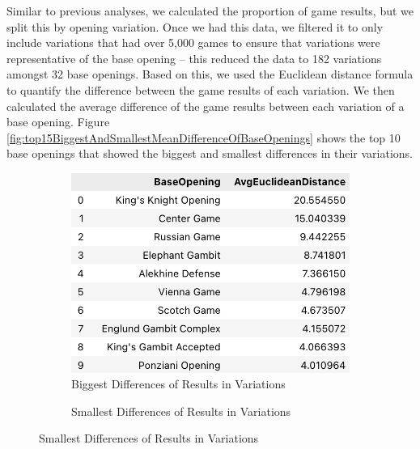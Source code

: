 \documentclass[a4paper, 11pt]{article}
\begin{document}
Similar to previous analyses, we calculated the proportion of game results, but we split this by opening variation. Once we had this data, we filtered it to only include variations that had over 5,000 games to ensure that variations were representative of the base opening -- this reduced the data to 182 variations amongst 32 base openings. Based on this, we used the Euclidean distance formula to quantify the difference between the game results of each variation. We then calculated the average difference of the game results between each variation of a base opening. Figure \ref{fig:top15BiggestAndSmallestMeanDifferenceOfBaseOpenings} shows the top 10 base openings that showed the biggest and smallest differences in their variations.

\begin{figure}[H]
    \centering
    \caption{Top 10 Openings with the Biggest and Smallest Differences of Results in Variations}
    \label{fig:top15BiggestAndSmallestMeanDifferenceOfBaseOpenings}
    \begin{subfigure}{0.49\textwidth}
        \centering
        \caption{Biggest Differences of Results in Variations}
        \label{fig:top15BiggestMeanDifferenceOfBaseOpenings}
        \includegraphics[width=\textwidth]{Top 10 Openings with Biggest Mean Difference in Variations.png}
    \end{subfigure}
    \hfill
    \begin{subfigure}{0.49\textwidth}
        \centering
        \caption{Smallest Differences of Results in Variations}
        \label{fig:top15SmallestMeanDifferenceOfBaseOpenings}

\end{subfigure}
\end{figure}
\end{document}
